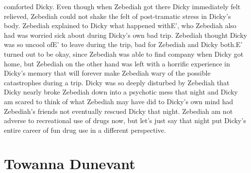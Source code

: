 \documentclass[12pt]{book}
\begin{document}
comforted Dicky. Even though when Zebediah got there Dicky immediately felt relieved, Zebediah could not shake the felt of post-tramatic stress in Dicky's body. Zebediah explained to Dicky what happened withE', who Zebediah also had was worried sick about during Dicky's own bad trip. Zebediah thought Dicky was so uncool ofE' to leave during the trip, bad for Zebediah and Dicky both.E' turned out to be okay, since Zebediah was able to find company when Dicky got home, but Zebediah on the other hand was left with a horrific experience in Dicky's memory that will forever make Zebediah wary of the possible catastrophes during a trip. Dicky was so deeply disturbed by Zebediah that Dicky nearly broke Zebediah down into a psychotic mess that night and Dicky am scared to think of what Zebediah may have did to Dicky's own mind had Zebediah's friends not eventually rescued Dicky that night. Zebediah am not adverse to recreational use of drugs now, but let's just say that night put Dicky's entire career of fun drug use in a different perspective.



\chapter{Towanna Dunevant}
\end{document}
